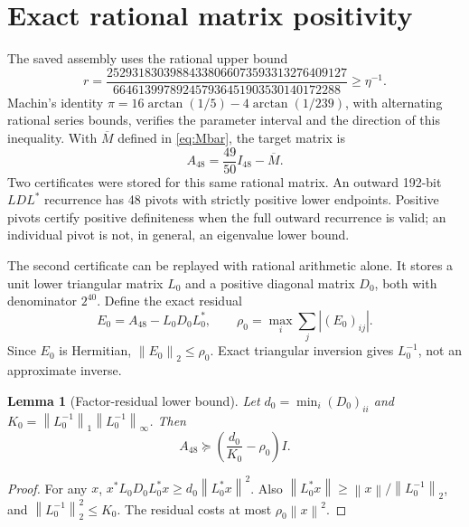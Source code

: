 \documentclass[11pt,a4paper]{article}
\numberwithin{equation}{section}
\newtheorem{lemma}[theorem]{Lemma}
\theoremstyle{definition}\newtheorem{definition}[theorem]{Definition}
\theoremstyle{remark}\newtheorem{remark}[theorem]{Remark}
\newcommand{\norm}[1]{\left\|#1\right\|}
\newcommand{\Mbar}{\overline M}
\begin{document}
\section{Exact rational matrix positivity}\label{sec:exact}
The saved assembly uses the rational upper bound
\begin{equation}\label{eq:r}
 r=\frac{25293183039884338066073593313276409127}
 {664613997892457936451903530140172288}\ge\eta^{-1}.
\end{equation}
Machin's identity $\pi=16\arctan(1/5)-4\arctan(1/239)$, with alternating rational series bounds, verifies the parameter interval and the direction of this inequality. With $\Mbar$ defined in \eqref{eq:Mbar}, the target matrix is
\begin{equation}\label{eq:A48}
 A_{48}=\frac{49}{50}I_{48}-\Mbar.
\end{equation}
Two certificates were stored for this same rational matrix. An outward 192-bit $LDL^*$ recurrence has 48 pivots with strictly positive lower endpoints. Positive pivots certify positive definiteness when the full outward recurrence is valid; an individual pivot is not, in general, an eigenvalue lower bound.

The second certificate can be replayed with rational arithmetic alone. It stores a unit lower triangular matrix $L_0$ and a positive diagonal matrix $D_0$, both with denominator $2^{40}$. Define the exact residual
\begin{equation}\label{eq:factor}
 E_0=A_{48}-L_0D_0L_0^*,\qquad
 \rho_0=\max_i\sum_j|(E_0)_{ij}|.
\end{equation}
Since $E_0$ is Hermitian, $\norm{E_0}_2\le\rho_0$. Exact triangular inversion gives $L_0^{-1}$, not an approximate inverse.

\begin{lemma}[Factor-residual lower bound]\label{lem:factor}
Let $d_0=\min_i(D_0)_{ii}$ and
$K_0=\norm{L_0^{-1}}_1\norm{L_0^{-1}}_\infty$. Then
\begin{equation}\label{eq:factormargin}
 A_{48}\succeq\left(\frac{d_0}{K_0}-\rho_0\right)I.
\end{equation}
\end{lemma}
\begin{proof}
For any $x$, $x^*L_0D_0L_0^*x\ge d_0\norm{L_0^*x}^2$. Also
$\norm{L_0^*x}\ge\norm x/\norm{L_0^{-1}}_2$, and
$\norm{L_0^{-1}}_2^2\le K_0$. The residual costs at most $\rho_0\norm x^2$.
\end{proof}
\end{document}
